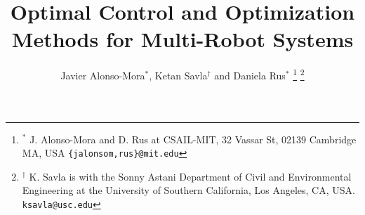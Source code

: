 \documentclass[letterpaper, 10 pt, conference]{ieeeconf}  %
\title{\LARGE \bf Optimal Control and Optimization Methods for Multi-Robot Systems}
\author{Javier Alonso-Mora$^{*}$, Ketan Savla$^{\dagger}$ and Daniela Rus$^{*}$%
\thanks{$^{*}$ J. Alonso-Mora and D. Rus at CSAIL-MIT, 32 Vassar St, 02139 Cambridge MA, USA
        {\tt\small \{jalonsom,rus\}@mit.edu}}%
\thanks{$^{\dagger}$ K. Savla is with the Sonny Astani Department of Civil and Environmental Engineering at the University of Southern California, Los Angeles, CA, USA.
        {\tt\small ksavla@usc.edu}}%
}
\begin{document}
\maketitle
\thispagestyle{empty}
\pagestyle{empty}

\begin{abstract}

\end{abstract}












%


% 
%
\end{document}
